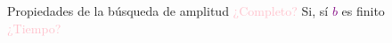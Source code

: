     \begin{frame}{Propiedades de la búsqueda de amplitud}
        \textcolor{Pink}{¿Completo?} Si, sí \textcolor{Purple}{$b$} es finito \\
        \textcolor{Pink}{¿Tiempo?}
    \end{frame}